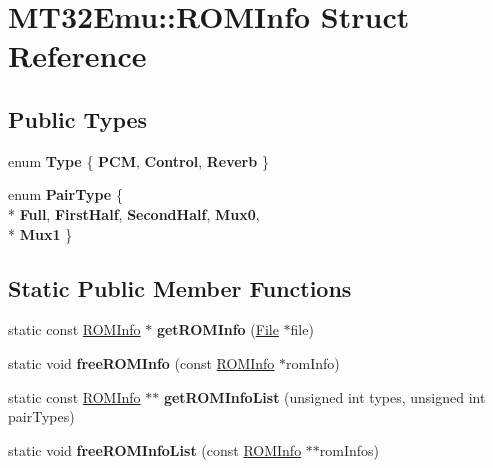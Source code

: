 \hypertarget{structMT32Emu_1_1ROMInfo}{\section{M\-T32\-Emu\-:\-:R\-O\-M\-Info Struct Reference}
\label{structMT32Emu_1_1ROMInfo}
}
\subsection*{Public Types}
\begin{DoxyCompactItemize}
\item 
enum {\bfseries Type} \{ {\bfseries P\-C\-M}, 
{\bfseries Control}, 
{\bfseries Reverb}
 \}
\item 
enum {\bfseries Pair\-Type} \{ \\*
{\bfseries Full}, 
{\bfseries First\-Half}, 
{\bfseries Second\-Half}, 
{\bfseries Mux0}, 
\\*
{\bfseries Mux1}
 \}
\end{DoxyCompactItemize}
\subsection*{Static Public Member Functions}
\begin{DoxyCompactItemize}
\item 
\hypertarget{structMT32Emu_1_1ROMInfo_acb8619ce4d802d67bc61f02408c5d8a4}{static const \hyperlink{structMT32Emu_1_1ROMInfo}{R\-O\-M\-Info} $\ast$ {\bfseries get\-R\-O\-M\-Info} (\hyperlink{classMT32Emu_1_1File}{File} $\ast$file)}\label{structMT32Emu_1_1ROMInfo_acb8619ce4d802d67bc61f02408c5d8a4}

\item 
\hypertarget{structMT32Emu_1_1ROMInfo_a3c34dce0e2b5c61a77dc49ec853ffc50}{static void {\bfseries free\-R\-O\-M\-Info} (const \hyperlink{structMT32Emu_1_1ROMInfo}{R\-O\-M\-Info} $\ast$rom\-Info)}\label{structMT32Emu_1_1ROMInfo_a3c34dce0e2b5c61a77dc49ec853ffc50}

\item 
\hypertarget{structMT32Emu_1_1ROMInfo_a1b4d06f04f8cf611adb86545bf46a7e5}{static const \hyperlink{structMT32Emu_1_1ROMInfo}{R\-O\-M\-Info} $\ast$$\ast$ {\bfseries get\-R\-O\-M\-Info\-List} (unsigned int types, unsigned int pair\-Types)}\label{structMT32Emu_1_1ROMInfo_a1b4d06f04f8cf611adb86545bf46a7e5}

\item 
\hypertarget{structMT32Emu_1_1ROMInfo_ae05ce501d54b17ac302128e371fd8187}{static void {\bfseries free\-R\-O\-M\-Info\-List} (const \hyperlink{structMT32Emu_1_1ROMInfo}{R\-O\-M\-Info} $\ast$$\ast$rom\-Infos)}\label{structMT32Emu_1_1ROMInfo_ae05ce501d54b17ac302128e371fd8187}

\end{DoxyCompactItemize}
